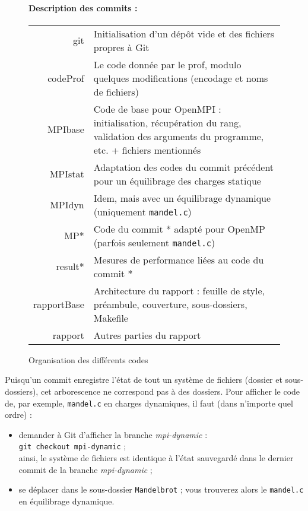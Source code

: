 \begin{figure*}
  \paragraph{Description des commits :}
  \begin{tabularx}{\textwidth}{r X}
    git & Initialisation d'un dépôt vide et des fichiers propres à
          Git\\
    codeProf & Le code donnée par le prof, modulo quelques
               modifications (encodage et noms de fichiers)\\
    MPIbase & Code de base pour OpenMPI : initialisation, récupération
              du rang, validation des arguments du programme, etc. +
              fichiers mentionnés\\
    MPIstat & Adaptation des codes du commit précédent pour un
              équilibrage des charges statique\\
    MPIdyn  & Idem, mais avec un équilibrage dynamique (uniquement
              \texttt{mandel.c})\\
    MP* & Code du commit * adapté pour OpenMP (parfois seulement
           \texttt{mandel.c})\\
    result* & Mesures de performance liées au code du commit *\\
    rapportBase & Architecture du rapport : feuille de style,
                  préambule, couverture, sous-dossiers, Makefile\\
    rapport & Autres parties du rapport
  \end{tabularx}

  \caption{Organisation des différents codes}
  \label{fig:git:hierarchie}
\end{figure*}

Puisqu'un commit enregistre l'état de tout un système de fichiers
(dossier et sous-dossiers), cet arborescence ne correspond pas à des
dossiers. Pour afficher le code de, par exemple, \texttt{mandel.c} en
charges dynamiques, il faut (dans n'importe quel ordre) :

\begin{itemize}
\item demander à Git d'afficher la branche \emph{mpi-dynamic} :\\
  \texttt{git checkout mpi-dynamic} ;\\ ainsi, le système de fichiers
  est identique à l'état sauvegardé dans le dernier commit de la
  branche \emph{mpi-dynamic} ;
\item se déplacer dans le sous-dossier \texttt{Mandelbrot} ; vous
  trouverez alors le \texttt{mandel.c} en équilibrage dynamique.
\end{itemize}

